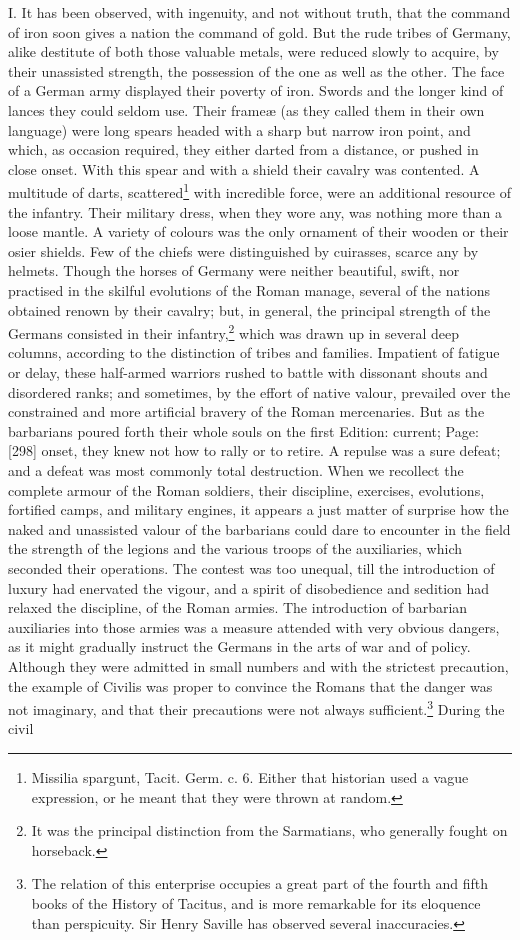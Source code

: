 I. It has been observed, with ingenuity, and not without truth, that the command of iron soon gives a nation the command of gold. But the rude tribes of Germany, alike destitute of both those valuable metals, were reduced slowly to acquire, by their unassisted strength, the possession of the one as well as the other. The face of a German army displayed their poverty of iron. Swords and the longer kind of lances they could seldom use. Their frameæ (as they called them in their own language) were long spears headed with a sharp but narrow iron point, and which, as occasion required, they either darted from a distance, or pushed in close onset. With this spear and with a shield their cavalry was contented. A multitude of darts, scattered\footnote{Missilia spargunt, Tacit. Germ. c. 6. Either that historian used a vague expression, or he meant that they were thrown at random.} with incredible force, were an additional resource of the infantry. Their military dress, when they wore any, was nothing more than a loose mantle. A variety of colours was the only ornament of their wooden or their osier shields. Few of the chiefs were distinguished by cuirasses, scarce any by helmets. Though the horses of Germany were neither beautiful, swift, nor practised in the skilful evolutions of the Roman manage, several of the nations obtained renown by their cavalry; but, in general, the principal strength of the Germans consisted in their infantry,\footnote{It was the principal distinction from the Sarmatians, who generally fought on horseback.} which was drawn up in several deep columns, according to the distinction of tribes and families. Impatient of fatigue or delay, these half-armed warriors rushed to battle with dissonant shouts and disordered ranks; and sometimes, by the effort of native valour, prevailed over the constrained and more artificial bravery of the Roman mercenaries. But as the barbarians poured forth their whole souls on the first Edition: current; Page: [298] onset, they knew not how to rally or to retire. A repulse was a sure defeat; and a defeat was most commonly total destruction. When we recollect the complete armour of the Roman soldiers, their discipline, exercises, evolutions, fortified camps, and military engines, it appears a just matter of surprise how the naked and unassisted valour of the barbarians could dare to encounter in the field the strength of the legions and the various troops of the auxiliaries, which seconded their operations. The contest was too unequal, till the introduction of luxury had enervated the vigour, and a spirit of disobedience and sedition had relaxed the discipline, of the Roman armies. The introduction of barbarian auxiliaries into those armies was a measure attended with very obvious dangers, as it might gradually instruct the Germans in the arts of war and of policy. Although they were admitted in small numbers and with the strictest precaution, the example of Civilis was proper to convince the Romans that the danger was not imaginary, and that their precautions were not always sufficient.\footnote{The relation of this enterprise occupies a great part of the fourth and fifth books of the History of Tacitus, and is more remarkable for its eloquence than perspicuity. Sir Henry Saville has observed several inaccuracies.} During the civil 
